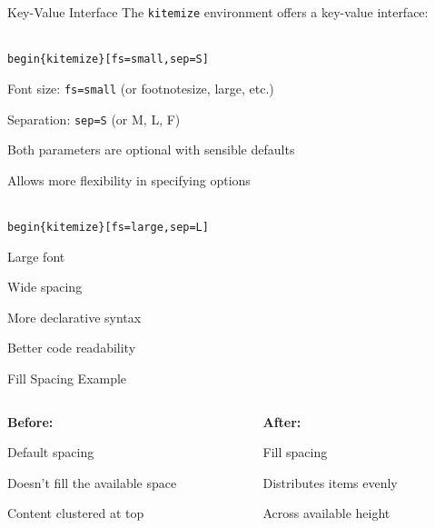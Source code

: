 \documentclass[11pt,compress,t,notes=noshow, xcolor=table]{beamer}
\begin{document}
\begin{frame}{Key-Value Interface}
  The \texttt{kitemize} environment offers a key-value interface:
  
  \vspace{0.3cm}
  \texttt{\\begin\{kitemize\}[fs=small,sep=S]}
  \begin{kitemize}[fs=small,sep=S]
    \item Font size: \texttt{fs=small} (or footnotesize, large, etc.)
    \item Separation: \texttt{sep=S} (or M, L, F)
    \item Both parameters are optional with sensible defaults
    \item Allows more flexibility in specifying options
  \end{kitemize}
  
  \vspace{0.3cm}
  \texttt{\\begin\{kitemize\}[fs=large,sep=L]}
  \begin{kitemize}[fs=large,sep=L]
    \item Large font
    \item Wide spacing
    \item More declarative syntax
    \item Better code readability
  \end{kitemize}
\end{frame}


\begin{frame}{Fill Spacing Example}
  \begin{columns}[T]
    \begin{column}{0.48\textwidth}
      \textbf{Before:}
      \begin{minipage}[t][0.6\textheight][t]{\textwidth}
        \begin{itemizeM}
          \item Default spacing
          \item Doesn't fill the available space
          \item Content clustered at top
        \end{itemizeM}
      \end{minipage}
    \end{column}
    
    \begin{column}{0.48\textwidth}
      \textbf{After:}
      \begin{minipage}[t][0.6\textheight][t]{\textwidth}
        \begin{itemizeF}
          \item Fill spacing
          \item Distributes items evenly
          \item Across available height
        \end{itemizeF}
      \end{minipage}
    \end{column}
  \end{columns}
\end{frame}
\end{document}
